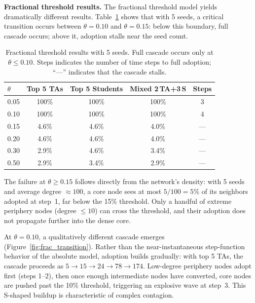 \documentclass[12pt]{article}
\begin{document}
\textbf{Fractional threshold results.}
The fractional threshold model yields dramatically different results. Table~\ref{tab:frac_sweep} shows that with 5 seeds, a critical transition occurs between $\theta = 0.10$ and $\theta = 0.15$: below this boundary, full cascade occurs; above it, adoption stalls near the seed count.

\begin{table}[H]
\centering
\caption{Fractional threshold results with 5 seeds. Full cascade occurs only at $\theta \leq 0.10$. Steps indicates the number of time steps to full adoption; ``---'' indicates that the cascade stalls.}
\label{tab:frac_sweep}
\begin{tabular}{lcccc}
\toprule
$\theta$ & Top 5 TAs & Top 5 Students & Mixed 2\,TA+3\,S & Steps \\
\midrule
0.05 & 100\% & 100\% & 100\% & 3 \\
0.10 & 100\% & 100\% & 100\% & 4 \\
\midrule
0.15 & 4.6\% & 4.6\% & 4.0\% & --- \\
0.20 & 4.6\% & 4.6\% & 4.0\% & --- \\
0.30 & 2.9\% & 4.6\% & 3.4\% & --- \\
0.50 & 2.9\% & 3.4\% & 2.9\% & --- \\
\bottomrule
\end{tabular}
\end{table}

The failure at $\theta \geq 0.15$ follows directly from the network's density: with 5 seeds and average degree ${\approx}100$, a core node sees at most $5/100 = 5\%$ of its neighbors adopted at step~1, far below the 15\% threshold. Only a handful of extreme periphery nodes (degree $\leq 10$) can cross the threshold, and their adoption does not propagate further into the dense core.

At $\theta = 0.10$, a qualitatively different cascade emerges (Figure~\ref{fig:frac_transition}). Rather than the near-instantaneous step-function behavior of the absolute model, adoption builds gradually: with top 5 TAs, the cascade proceeds as $5 \to 15 \to 24 \to 78 \to 174$. Low-degree periphery nodes adopt first (steps 1--2), then once enough intermediate nodes have converted, core nodes are pushed past the 10\% threshold, triggering an explosive wave at step~3. This S-shaped buildup is characteristic of complex contagion.
\end{document}
